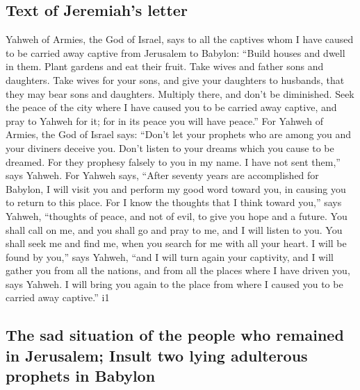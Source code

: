 \hypertarget{text-of-jeremiahs-letter}{%
\subsection{Text of Jeremiah's letter}\label{text-of-jeremiahs-letter}}

 Yahweh of Armies, the God of Israel, says to all the
captives whom I have caused to be carried away captive from Jerusalem to
Babylon:  ``Build houses and dwell in them. Plant gardens
and eat their fruit.  Take wives and father sons and
daughters. Take wives for your sons, and give your daughters to
husbands, that they may bear sons and daughters. Multiply there, and
don't be diminished.  Seek the peace of the city where I
have caused you to be carried away captive, and pray to Yahweh for it;
for in its peace you will have peace.''  For Yahweh of
Armies, the God of Israel says: ``Don't let your prophets who are among
you and your diviners deceive you. Don't listen to your dreams which you
cause to be dreamed.  For they prophesy falsely to you in
my name. I have not sent them,'' says Yahweh.  For Yahweh
says, ``After seventy years are accomplished for Babylon, I will visit
you and perform my good word toward you, in causing you to return to
this place.  For I know the thoughts that I think toward
you,'' says Yahweh, ``thoughts of peace, and not of evil, to give you
hope and a future.  You shall call on me, and you shall
go and pray to me, and I will listen to you.  You shall
seek me and find me, when you search for me with all your heart.
 I will be found by you,'' says Yahweh, ``and I will turn
again your captivity, and I will gather you from all the nations, and
from all the places where I have driven you, says Yahweh. I will bring
you again to the place from where I caused you to be carried away
captive.'' i1

\hypertarget{the-sad-situation-of-the-people-who-remained-in-jerusalem-insult-two-lying-adulterous-prophets-in-babylon}{%
\subsection{The sad situation of the people who remained in Jerusalem;
Insult two lying adulterous prophets in
Babylon}\label{the-sad-situation-of-the-people-who-remained-in-jerusalem-insult-two-lying-adulterous-prophets-in-babylon}}

